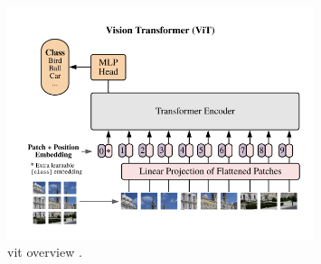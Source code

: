 \begin{figure}[H]
    \centering
    \includegraphics[width=0.8\textwidth]{fig/rel/images/vit_schema.png}
    \caption{\gls{vit} overview \autocite{dosovitskiy2020image}.}
    \label{fig:rel_vit}
\end{figure}
